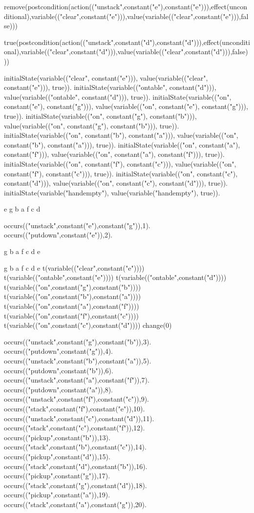 remove(postcondition(action(("unstack",constant("e"),constant("e"))),effect(unconditional),variable(("clear",constant("e"))),value(variable(("clear",constant("e"))),false)))

true(postcondition(action(("unstack",constant("d"),constant("d"))),effect(unconditional),variable(("clear",constant("d"))),value(variable(("clear",constant("d"))),false)))


initialState(variable(("clear", constant("e"))), value(variable(("clear", constant("e"))), true)).
initialState(variable(("ontable", constant("d"))), value(variable(("ontable", constant("d"))), true)).
initialState(variable(("on", constant("e"), constant("g"))), value(variable(("on", constant("e"), constant("g"))), true)).
initialState(variable(("on", constant("g"), constant("b"))), value(variable(("on", constant("g"), constant("b"))), true)).
initialState(variable(("on", constant("b"), constant("a"))), value(variable(("on", constant("b"), constant("a"))), true)).
initialState(variable(("on", constant("a"), constant("f"))), value(variable(("on", constant("a"), constant("f"))), true)).
initialState(variable(("on", constant("f"), constant("c"))), value(variable(("on", constant("f"), constant("c"))), true)).
initialState(variable(("on", constant("c"), constant("d"))), value(variable(("on", constant("c"), constant("d"))), true)).
initialState(variable("handempty"), value(variable("handempty"), true)).


e    
g
b
a
f
c
d 

occurs(("unstack",constant("e"),constant("g")),1). 
occurs(("putdown",constant("e")),2). 

    
g
b
a
f
c
d    e


g
b
a
f
c
d      e 
t(variable(("clear",constant("e")))) t(variable(("ontable",constant("e")))) t(variable(("ontable",constant("d")))) t(variable(("on",constant("g"),constant("b")))) t(variable(("on",constant("b"),constant("a")))) t(variable(("on",constant("a"),constant("f")))) t(variable(("on",constant("f"),constant("c")))) t(variable(("on",constant("c"),constant("d")))) change(0)


occurs(("unstack",constant("g"),constant("b")),3). 
occurs(("putdown",constant("g")),4). 
occurs(("unstack",constant("b"),constant("a")),5). 
occurs(("putdown",constant("b")),6). 
occurs(("unstack",constant("a"),constant("f")),7). 
occurs(("putdown",constant("a")),8). 
occurs(("unstack",constant("f"),constant("c")),9). 
occurs(("stack",constant("f"),constant("e")),10). 
occurs(("unstack",constant("c"),constant("d")),11). 
occurs(("stack",constant("c"),constant("f")),12). 
occurs(("pickup",constant("b")),13). 
occurs(("stack",constant("b"),constant("c")),14). 
occurs(("pickup",constant("d")),15). 
occurs(("stack",constant("d"),constant("b")),16). 
occurs(("pickup",constant("g")),17). 
occurs(("stack",constant("g"),constant("d")),18). 
occurs(("pickup",constant("a")),19). 
occurs(("stack",constant("a"),constant("g")),20). 


